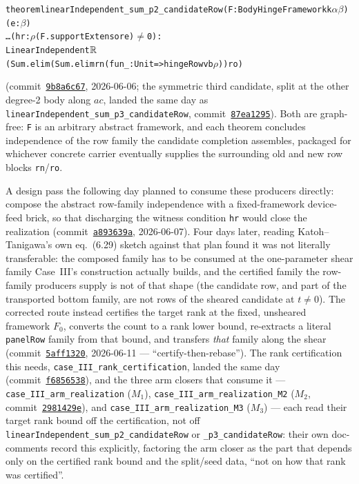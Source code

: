 \begin{alltt}
theorem linearIndependent_sum_p2_candidateRow (F : BodyHingeFramework k \(\alpha\) \(\beta\)) (e : \(\beta\))
    \dots (hr : \(\rho\) (F.supportExtensor e) \(\neq\) 0) :
    LinearIndependent \(\R\)
      (Sum.elim (Sum.elim rn (fun _ : Unit => hingeRow v b \(\rho\))) ro)
\end{alltt}
(commit~\href{https://github.com/bryangingechen/CombinatorialRigidity/commit/9b8a6c6779d9ee0ebeaac479372deb555ca17e77}{\texttt{9b8a6c67}},
2026-06-06; the symmetric third candidate, split at the other degree-2 body
along $ac$, landed the same day as
\texttt{linearIndependent\_sum\_p3\_candidateRow},
commit~\href{https://github.com/bryangingechen/CombinatorialRigidity/commit/87ea12952bc67dde7aae11968da1061a28b3b40c}{\texttt{87ea1295}}).
Both are graph-free: \texttt{F} is an arbitrary abstract framework, and each
theorem concludes independence of the row family the candidate completion
assembles, packaged for whichever concrete carrier eventually supplies the
surrounding old and new row blocks \texttt{rn}/\texttt{ro}.

A design pass the following day planned to consume these producers
directly: compose the abstract row-family independence with a fixed-framework
device-feed brick, so that discharging the witness condition \texttt{hr}
would close the realization
(commit~\href{https://github.com/bryangingechen/CombinatorialRigidity/commit/a893639add286e64d176bde5a4fb2431289a8820}{\texttt{a893639a}},
2026-06-07). Four days later, reading Katoh--Tanigawa's own eq.~(6.29) sketch
against that plan found it was not literally transferable: the composed
family has to be consumed at the one-parameter shear family Case~III's
construction actually builds, and the certified family the row-family
producers supply is not of that shape (the candidate row, and part of the
transported bottom family, are not rows of the sheared candidate at $t \neq
0$). The corrected route instead certifies the target rank at the fixed,
unsheared framework $F_0$, converts the count to a rank lower bound,
re-extracts a literal \texttt{panelRow} family from that bound, and
transfers \emph{that} family along the shear
(commit~\href{https://github.com/bryangingechen/CombinatorialRigidity/commit/5aff13201353fe8a2ebf70ca69b18416f507aea7}{\texttt{5aff1320}},
2026-06-11 --- ``certify-then-rebase''). The rank certification this needs,
\texttt{case\_III\_rank\_certification}, landed the same day
(commit~\href{https://github.com/bryangingechen/CombinatorialRigidity/commit/f6856538177df6cfe5365a06c63a2feae2fffb72}{\texttt{f6856538}}),
and the three arm closers that consume it ---
\texttt{case\_III\_arm\_realization} ($M_1$),
\texttt{case\_III\_arm\_realization\_M2} ($M_2$,
commit~\href{https://github.com/bryangingechen/CombinatorialRigidity/commit/2981429e19315fe4ed2dc9c3aad60c22719ee2c3}{\texttt{2981429e}}),
and \texttt{case\_III\_arm\_realization\_M3} ($M_3$) --- each read their
target rank bound off the certification, not off
\texttt{linearIndependent\_sum\_p2\_candidateRow} or
\texttt{\_p3\_candidateRow}: their own doc-comments record this explicitly,
factoring the arm closer as the part that depends only on the certified rank
bound and the split/seed data, ``not on how that rank was certified''.

